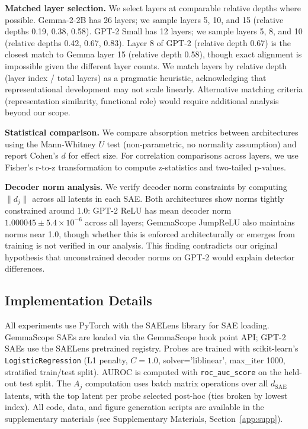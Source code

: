 \documentclass{article}
\begin{document}
\textbf{Matched layer selection.} We select layers at comparable relative depths where possible. Gemma-2-2B has 26 layers; we sample layers 5, 10, and 15 (relative depths 0.19, 0.38, 0.58). GPT-2 Small has 12 layers; we sample layers 5, 8, and 10 (relative depths 0.42, 0.67, 0.83). Layer 8 of GPT-2 (relative depth 0.67) is the closest match to Gemma layer 15 (relative depth 0.58), though exact alignment is impossible given the different layer counts. We match layers by relative depth (layer index / total layers) as a pragmatic heuristic, acknowledging that representational development may not scale linearly. Alternative matching criteria (representation similarity, functional role) would require additional analysis beyond our scope.

\textbf{Statistical comparison.} We compare absorption metrics between architectures using the Mann-Whitney $U$ test (non-parametric, no normality assumption) and report Cohen's $d$ for effect size. For correlation comparisons across layers, we use Fisher's r-to-z transformation to compute z-statistics and two-tailed p-values.

\textbf{Decoder norm analysis.} We verify decoder norm constraints by computing $\|d_j\|$ across all latents in each SAE. Both architectures show norms tightly constrained around 1.0: GPT-2 ReLU has mean decoder norm $1.000045 \pm 5.4 \times 10^{-6}$ across all layers; GemmaScope JumpReLU also maintains norms near 1.0, though whether this is enforced architecturally or emerges from training is not verified in our analysis. This finding contradicts our original hypothesis that unconstrained decoder norms on GPT-2 would explain detector differences.

\subsection{Implementation Details}

All experiments use PyTorch with the SAELens library \citep{bloom2024saelens} for SAE loading. GemmaScope SAEs are loaded via the GemmaScope hook point API; GPT-2 SAEs use the SAELens pretrained registry. Probes are trained with scikit-learn's \texttt{LogisticRegression} (L1 penalty, $C=1.0$, solver='liblinear', max\_iter 1000, stratified train/test split). AUROC is computed with \texttt{roc\_auc\_score} on the held-out test split. The $A_j$ computation uses batch matrix operations over all $d_{\text{SAE}}$ latents, with the top latent per probe selected post-hoc (ties broken by lowest index). All code, data, and figure generation scripts are available in the supplementary materials (see Supplementary Materials, Section~\ref{app:supp}).
\end{document}
